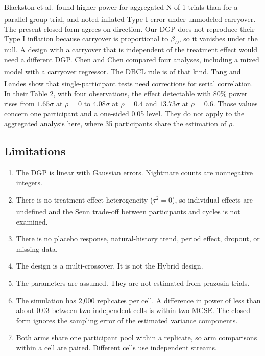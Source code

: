 \documentclass[
  11pt,
]{article}
\providecommand{\tightlist}{%
  \setlength{\itemsep}{0pt}\setlength{\parskip}{0pt}}
\begin{document}
Blackston et al.~found higher power for aggregated N-of-1 trials than for a parallel-group trial, and noted inflated Type I error under unmodeled carryover\textsuperscript{}. The present closed form agrees on direction. Our DGP does not reproduce their Type I inflation because carryover is proportional to \(\beta_D\), so it vanishes under the null. A design with a carryover that is independent of the treatment effect would need a different DGP. Chen and Chen compared four analyses, including a mixed model with a carryover regressor\textsuperscript{}. The DBCL rule is of that kind. Tang and Landes show that single-participant tests need corrections for serial correlation\textsuperscript{}. In their Table 2, with four observations, the effect detectable with 80\% power rises from \(1.65\sigma\) at \(\rho = 0\) to \(4.08\sigma\) at \(\rho = 0.4\) and \(13.73\sigma\) at \(\rho = 0.6\). Those values concern one participant and a one-sided 0.05 level. They do not apply to the aggregated analysis here, where 35 participants share the estimation of \(\rho\).

\subsection{Limitations}\label{limitations}

\begin{enumerate}
\def\labelenumi{\arabic{enumi}.}
\tightlist
\item
  The DGP is linear with Gaussian errors. Nightmare counts are nonnegative integers.
\item
  There is no treatment-effect heterogeneity (\(\tau^2 = 0\)), so individual effects are undefined and the Senn trade-off between participants and cycles\textsuperscript{} is not examined.
\item
  There is no placebo response, natural-history trend, period effect, dropout, or missing data.
\item
  The design is a multi-crossover. It is not the Hybrid design.
\item
  The parameters are assumed. They are not estimated from prazosin trials.
\item
  The simulation has 2,000 replicates per cell. A difference in power of less than about 0.03 between two independent cells is within two MCSE. The closed form ignores the sampling error of the estimated variance components.
\item
  Both arms share one participant pool within a replicate, so arm comparisons within a cell are paired. Different cells use independent streams.
\end{enumerate}
\end{document}
